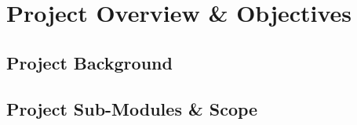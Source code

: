 \chapter{Project Overview \& Objectives}
\label{chap:project_overview}

\section{Project Background}

\section{Project Sub-Modules \& Scope}
